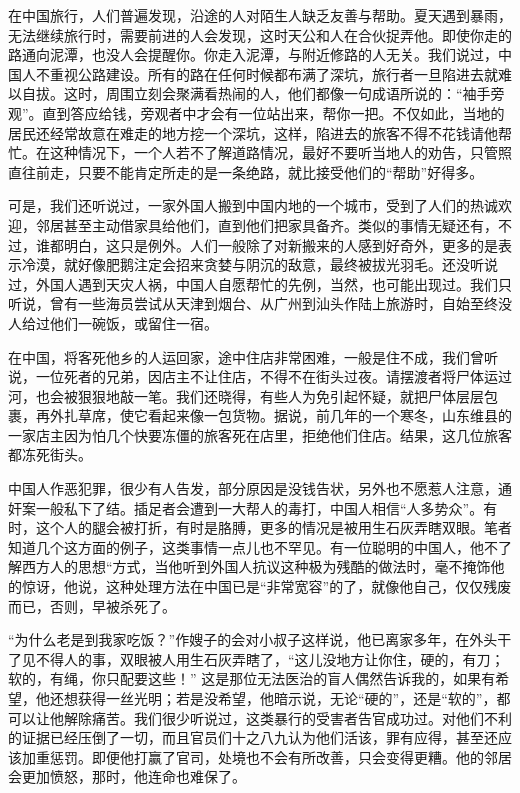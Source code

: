 \documentclass[12pt,oneside]{book}
\begin{document}
\begin{common-format}
在中国旅行，人们普遍发现，沿途的人对陌生人缺乏友善与帮助。夏天遇到暴雨，无法继续旅行时，需要前进的人会发现，这时天公和人在合伙捉弄他。即使你走的路通向泥潭，也没人会提醒你。你走入泥潭，与附近修路的人无关。我们说过，中国人不重视公路建设。所有的路在任何时候都布满了深坑，旅行者一旦陷进去就难以自拔。这时，周围立刻会聚满看热闹的人，他们都像一句成语所说的：“袖手旁观”。直到答应给钱，旁观者中才会有一位站出来，帮你一把。不仅如此，当地的居民还经常故意在难走的地方挖一个深坑，这样，陷进去的旅客不得不花钱请他帮忙。在这种情况下，一个人若不了解道路情况，最好不要听当地人的劝告，只管照直往前走，只要不能肯定所走的是一条绝路，就比接受他们的“帮助”好得多。 

可是，我们还听说过，一家外国人搬到中国内地的一个城市，受到了人们的热诚欢迎，邻居甚至主动借家具给他们，直到他们把家具备齐。类似的事情无疑还有，不过，谁都明白，这只是例外。人们一般除了对新搬来的人感到好奇外，更多的是表示冷漠，就好像肥鹅注定会招来贪婪与阴沉的敌意，最终被拔光羽毛。还没听说过，外国人遇到天灾人祸，中国人自愿帮忙的先例，当然，也可能出现过。我们只听说，曾有一些海员尝试从天津到烟台、从广州到汕头作陆上旅游时，自始至终没人给过他们一碗饭，或留住一宿。 

在中国，将客死他乡的人运回家，途中住店非常困难，一般是住不成，我们曾听说，一位死者的兄弟，因店主不让住店，不得不在街头过夜。请摆渡者将尸体运过河，也会被狠狠地敲一笔。我们还晓得，有些人为免引起怀疑，就把尸体层层包裹，再外扎草席，使它看起来像一包货物。据说，前几年的一个寒冬，山东维县的一家店主因为怕几个快要冻僵的旅客死在店里，拒绝他们住店。结果，这几位旅客都冻死街头。 

中国人作恶犯罪，很少有人告发，部分原因是没钱告状，另外也不愿惹人注意，通奸案一般私下了结。插足者会遭到一大帮人的毒打，中国人相信“人多势众”。有时，这个人的腿会被打折，有时是胳膊，更多的情况是被用生石灰弄瞎双眼。笔者知道几个这方面的例子，这类事情一点儿也不罕见。有一位聪明的中国人，他不了解西方人的思想“方式，当他听到外国人抗议这种极为残酷的做法时，毫不掩饰他的惊讶，他说，这种处理方法在中国已是“非常宽容”的了，就像他自己，仅仅残废而已，否则，早被杀死了。 

“为什么老是到我家吃饭？”作嫂子的会对小叔子这样说，他已离家多年，在外头干了见不得人的事，双眼被人用生石灰弄瞎了，“这儿没地方让你住，硬的，有刀；软的，有绳，你只配要这些！” 这是那位无法医治的盲人偶然告诉我的，如果有希望，他还想获得一丝光明；若是没希望，他暗示说，无论“硬的”，还是“软的”，都可以让他解除痛苦。我们很少听说过，这类暴行的受害者告官成功过。对他们不利的证据已经压倒了一切，而且官员们十之八九认为他们活该，罪有应得，甚至还应该加重惩罚。即便他打赢了官司，处境也不会有所改善，只会变得更糟。他的邻居会更加愤怒，那时，他连命也难保了。 


\end{common-format}
\end{document}
